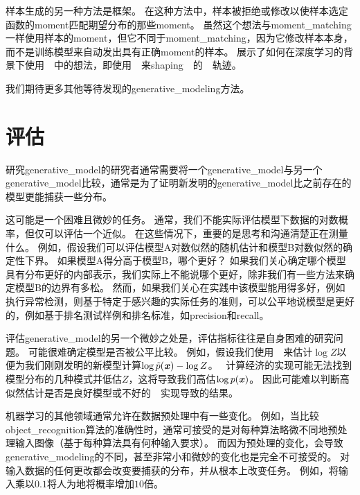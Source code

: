 样本生成的另一种方法是框架\citep{rubin1984bayesianly}。
在这种方法中，样本被拒绝或修改以使样本选定函数的\gls{moment}匹配期望分布的那些\gls{moment}。
虽然这个想法与\gls{moment_matching}一样使用样本的\gls{moment}，但它不同于\gls{moment_matching}，因为它修改样本本身，而不是训练模型来自动发出具有正确\gls{moment}的样本。
\citet{BachmanP15} 展示了如何在深度学习的背景下使用~~中的想法，即使用~~来\gls{shaping}~~的~~轨迹。

我们期待更多其他等待发现的\gls{generative_modeling}方法。


\section{评估}
\label{sec:evaluating_generative_models}

研究\gls{generative_model}的研究者通常需要将一个\gls{generative_model}与另一个\gls{generative_model}比较，通常是为了证明新发明的\gls{generative_model}比之前存在的模型更能捕获一些分布。

这可能是一个困难且微妙的任务。
通常，我们不能实际评估模型下数据的对数概率，但仅可以评估一个近似。
在这些情况下，重要的是思考和沟通清楚正在测量什么。
例如，假设我们可以评估模型A对数似然的随机估计和模型B对数似然的确定性下界。
如果模型A得分高于模型B，哪个更好？
如果我们关心确定哪个模型具有分布更好的内部表示，我们实际上不能说哪个更好，除非我们有一些方法来确定模型B的边界有多松。
然而，如果我们关心在实践中该模型能用得多好，例如执行异常检测，则基于特定于感兴趣的实际任务的准则，可以公平地说模型是更好的，例如基于排名测试样例和排名标准，如\gls{precision}和\gls{recall}。

评估\gls{generative_model}的另一个微妙之处是，评估指标往往是自身困难的研究问题。 
可能很难确定模型是否被公平比较。
例如，假设我们使用~~来估计$\log Z$以便为我们刚刚发明的新模型计算$\log \tilde{p}(\boldsymbol{\mathit{x}}) - \log Z$。
~计算经济的实现可能无法找到模型分布的几种模式并低估$Z$，这将导致我们高估$\log p(\boldsymbol{\mathit{x}})$。
因此可能难以判断高似然估计是否是良好模型或不好的~~实现导致的结果。
 
机器学习的其他领域通常允许在数据预处理中有一些变化。
例如，当比较\gls{object_recognition}算法的准确性时，通常可接受的是对每种算法略微不同地预处理输入图像（基于每种算法具有何种输入要求）。
而因为预处理的变化，会导致\gls{generative_modeling}的不同，甚至非常小和微妙的变化也是完全不可接受的。
对输入数据的任何更改都会改变要捕获的分布，并从根本上改变任务。
例如，将输入乘以$0.1$将人为地将概率增加$10$倍。

